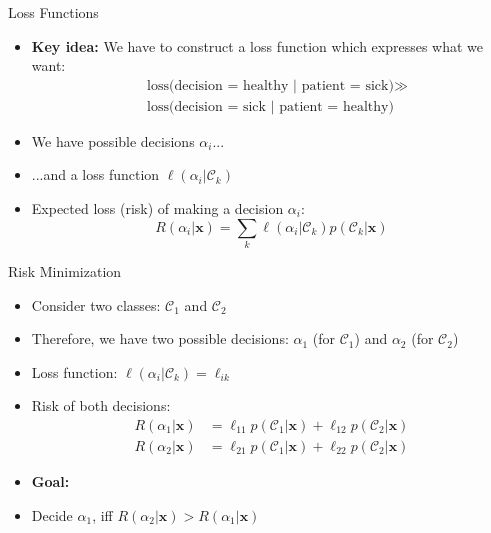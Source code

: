 \begin{frame}{Loss Functions}{}
	\begin{itemize}
		\item \textbf{Key idea:} We have to construct a loss function which expresses what we want:
		\begin{align*}
			&\text{loss(decision = healthy | patient = sick)} \gg \\
			&\text{loss(decision = sick | patient = healthy)}
		\end{align*}
		\item We have possible decisions $\alpha_i$...
		\item ...and a loss function $\ell(\alpha_i \vert \mathcal{C}_k)$
		\item Expected loss (risk) of making a decision $\alpha_i$:
		\begin{equation}
			R(\alpha_i \vert \bm{x}) = \sum_k \ell(\alpha_i \vert \mathcal{C}_k) p(\mathcal{C}_k \vert \bm{x})
		\end{equation}
	\end{itemize}
\end{frame}


\begin{frame}{Risk Minimization}{}
	\begin{itemize}
		\item Consider two classes: $\mathcal{C}_1$ and $\mathcal{C}_2$
		\item Therefore, we have two possible decisions: $\alpha_1$ (for $\mathcal{C}_1$) and $\alpha_2$ (for $\mathcal{C}_2$)
		\item Loss function: $\ell(\alpha_i \vert \mathcal{C}_k) = \ell_{ik}$
		\item Risk of both decisions:
		\begin{align*}
			R(\alpha_1 \vert \bm{x}) &= \ell_{11} p(\mathcal{C}_1 \vert \bm{x}) + \ell_{12} p(\mathcal{C}_2 \vert \bm{x}) \\
			R(\alpha_2 \vert \bm{x}) &= \ell_{21} p(\mathcal{C}_1 \vert \bm{x}) + \ell_{22} p(\mathcal{C}_2 \vert \bm{x})
		\end{align*}
		\item \textbf{Goal:} 
		\item Decide $\alpha_1$, iff $R(\alpha_2 \vert \bm{x}) > R(\alpha_1 \vert \bm{x})$
	\end{itemize}
\end{frame}


